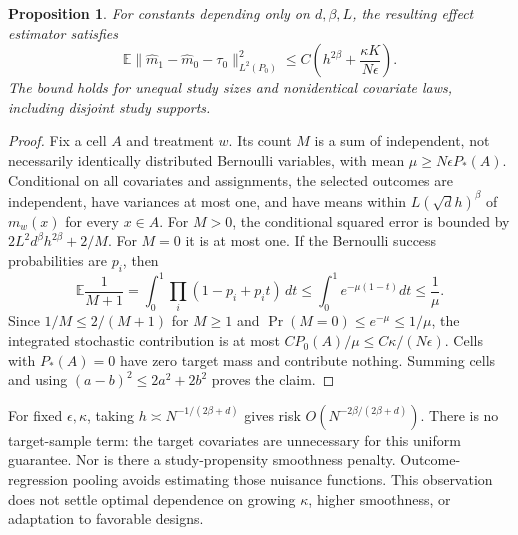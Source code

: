 \documentclass[11pt]{article}
\newtheorem{proposition}{Proposition}
\newcommand{\E}{\mathbb E}
\begin{document}
\begin{proposition}
For constants depending only on $d,\beta,L$, the resulting effect estimator
satisfies
\[
 \E\|\widehat m_1-\widehat m_0-\tau_0\|_{L^2(P_0)}^2
 \leq C\left(h^{2\beta}+\frac{\kappa K}{N\epsilon}\right).
\]
The bound holds for unequal study sizes and nonidentical covariate laws,
including disjoint study supports.
\end{proposition}
\begin{proof}
Fix a cell $A$ and treatment $w$. Its count $M$ is a sum of independent,
not necessarily identically distributed Bernoulli variables, with mean
$\mu\geq N\epsilon P_*(A)$. Conditional on all covariates and assignments,
the selected outcomes are independent, have variances at most one, and
have means within $L(\sqrt d h)^\beta$ of $m_w(x)$ for every $x\in A$.
For $M>0$, the conditional squared error is bounded by
$2L^2d^\beta h^{2\beta}+2/M$. For $M=0$ it is at most one.
If the Bernoulli success probabilities are $p_i$, then
\[
 \E\frac1{M+1}
 =\int_0^1\prod_i(1-p_i+p_it)\,dt
 \leq\int_0^1e^{-\mu(1-t)}dt\leq\frac1\mu.
\]
Since $1/M\leq2/(M+1)$ for $M\geq1$ and
$\Pr(M=0)\leq e^{-\mu}\leq1/\mu$, the integrated stochastic
contribution is at most $C P_0(A)/\mu\leq C\kappa/(N\epsilon)$.
Cells with $P_*(A)=0$ have zero target mass and contribute nothing.
Summing cells and using $(a-b)^2\leq2a^2+2b^2$ proves the claim.
\end{proof}
For fixed $\epsilon,\kappa$, taking $h\asymp N^{-1/(2\beta+d)}$
gives risk $O(N^{-2\beta/(2\beta+d)})$. There is no target-sample term:
the target covariates are unnecessary for this uniform guarantee.
Nor is there a study-propensity smoothness penalty. Outcome-regression
pooling avoids estimating those nuisance functions. This observation does
not settle optimal dependence on growing $\kappa$, higher smoothness, or
adaptation to favorable designs.
\end{document}

